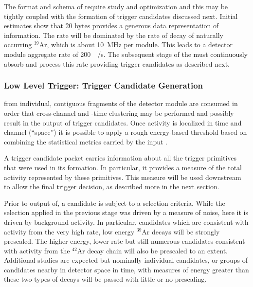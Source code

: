 The format and schema of  require study and
optimization and this may be tightly coupled with the formation of
trigger candidates discussed next. 
Initial estimates show that 20 bytes provides a generous data
representation of  information. 
The  rate will be dominated by the rate of decay of naturally occurring
$^{39}$Ar, which is about \SI{10}{\mega\hertz} per module.
This leads to a detector module aggregate rate of
\SI{200}{\mega\byte/\second}.
The subsequent stage of the  must continuously absorb and process this
rate providing trigger candidates as described next.


\subsubsection{Low Level Trigger: Trigger Candidate Generation}

 from individual, contiguous fragments of the detector
module are consumed in order that cross-channel and -time clustering may be
performed and possibly result in the output of trigger candidates.
Once activity is localized in time and channel (``space'') it is
possible to apply a rough energy-based threshold based on combining the
statistical metrics carried by the input .

A trigger candidate packet carries information about all the trigger
primitives that were used in its formation. 
In particular, it provides a measure of the total activity represented
by these primitives.
This measure will be used downstream to allow the final trigger
decision, as described more in the next section.

Prior to output of, a candidate is subject to a selection criteria.
While the selection applied in the previous stage was driven by a
measure of noise, here it is driven by background activity.  
In particular, candidates which are consistent with activity from the
very high rate, low energy $^{39}$Ar decays will be strongly prescaled. 
The higher energy, lower rate but still numerous candidates consistent
with activity from the $^{42}$Ar decay chain will also be prescaled to
an extent. 
Additional studies are expected but nominally individual candidates, or
groups of candidates nearby in detector space in time, with measures of
energy greater than these two types of decays will be passed with little
or no prescaling.



